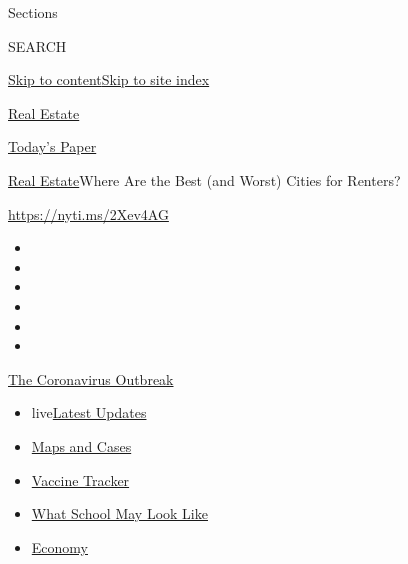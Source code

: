 Sections

SEARCH

\protect\hyperlink{site-content}{Skip to
content}\protect\hyperlink{site-index}{Skip to site index}

\href{https://www.nytimes.com/section/realestate}{Real Estate}

\href{https://myaccount.nytimes.com/auth/login?response_type=cookie\&client_id=vi}{}

\href{https://www.nytimes.com/section/todayspaper}{Today's Paper}

\href{/section/realestate}{Real Estate}\textbar{}Where Are the Best (and
Worst) Cities for Renters?

\url{https://nyti.ms/2Xev4AG}

\begin{itemize}
\item
\item
\item
\item
\item
\item
\end{itemize}

\href{https://www.nytimes.com/news-event/coronavirus?action=click\&pgtype=Article\&state=default\&region=TOP_BANNER\&context=storylines_menu}{The
Coronavirus Outbreak}

\begin{itemize}
\tightlist
\item
  live\href{https://www.nytimes.com/2020/08/01/world/coronavirus-covid-19.html?action=click\&pgtype=Article\&state=default\&region=TOP_BANNER\&context=storylines_menu}{Latest
  Updates}
\item
  \href{https://www.nytimes.com/interactive/2020/us/coronavirus-us-cases.html?action=click\&pgtype=Article\&state=default\&region=TOP_BANNER\&context=storylines_menu}{Maps
  and Cases}
\item
  \href{https://www.nytimes.com/interactive/2020/science/coronavirus-vaccine-tracker.html?action=click\&pgtype=Article\&state=default\&region=TOP_BANNER\&context=storylines_menu}{Vaccine
  Tracker}
\item
  \href{https://www.nytimes.com/interactive/2020/07/29/us/schools-reopening-coronavirus.html?action=click\&pgtype=Article\&state=default\&region=TOP_BANNER\&context=storylines_menu}{What
  School May Look Like}
\item
  \href{https://www.nytimes.com/live/2020/07/31/business/stock-market-today-coronavirus?action=click\&pgtype=Article\&state=default\&region=TOP_BANNER\&context=storylines_menu}{Economy}
\end{itemize}

